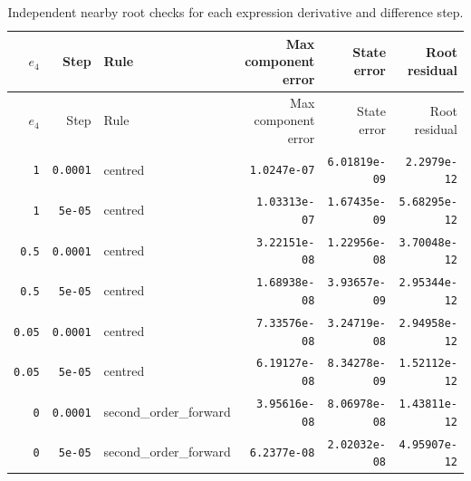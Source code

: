 \begingroup\scriptsize
\setlength{\tabcolsep}{3pt}
\begin{longtable}{rrlrrr}
\caption{Independent nearby root checks for each expression derivative and difference step.}\\
\toprule
$e_4$ & Step & Rule & Max component error & State error & Root residual \\
\midrule\endfirsthead
\toprule
$e_4$ & Step & Rule & Max component error & State error & Root residual \\
\midrule\endhead
\bottomrule\endfoot
\texttt{1} & \texttt{0.0001} & centred & \texttt{1.0247e-07} & \texttt{6.01819e-09} & \texttt{2.2979e-12} \\
\texttt{1} & \texttt{5e-05} & centred & \texttt{1.03313e-07} & \texttt{1.67435e-09} & \texttt{5.68295e-12} \\
\texttt{0.5} & \texttt{0.0001} & centred & \texttt{3.22151e-08} & \texttt{1.22956e-08} & \texttt{3.70048e-12} \\
\texttt{0.5} & \texttt{5e-05} & centred & \texttt{1.68938e-08} & \texttt{3.93657e-09} & \texttt{2.95344e-12} \\
\texttt{0.05} & \texttt{0.0001} & centred & \texttt{7.33576e-08} & \texttt{3.24719e-08} & \texttt{2.94958e-12} \\
\texttt{0.05} & \texttt{5e-05} & centred & \texttt{6.19127e-08} & \texttt{8.34278e-09} & \texttt{1.52112e-12} \\
\texttt{0} & \texttt{0.0001} & second\_order\_forward & \texttt{3.95616e-08} & \texttt{8.06978e-08} & \texttt{1.43811e-12} \\
\texttt{0} & \texttt{5e-05} & second\_order\_forward & \texttt{6.2377e-08} & \texttt{2.02032e-08} & \texttt{4.95907e-12} \\
\end{longtable}
\endgroup


